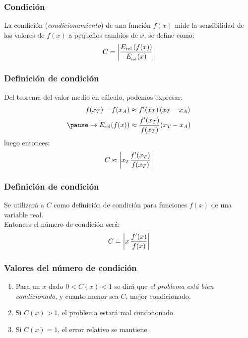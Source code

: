 \documentclass[12pt]{beamer}
\begin{document}
\begin{frame}
\frametitle{Condición}
La condición (\emph{condicionamiento}) de una función $f(x)$ mide la sensibilidad de los valores de $f(x)$ a pequeños
cambios de $x$, se define como:
\pause
\begin{align*}
C = \abs{ \dfrac{E_{\text{rel}} \, (f (x))}{E_{_\text{rel}} (x)} }
\end{align*}
\end{frame}
\begin{frame}
\frametitle{Definición de condición}
Del teorema del valor medio en cálculo, podemos expresar:
\pause
\begin{eqnarray*}
\begin{aligned}
f (x_{T}) - f (x_{A})  &\approx \pderivada{f} (x_{T}) \, (x_{T} - x_{A}) \\ \pause
\rightarrow E_{\text{rel}} (f (x)) &\approx \dfrac{ \pderivada{f} (x_{T})}{ f(x_{T})} (x_{T} - x_{A})
\end{aligned}
\end{eqnarray*}
luego entonces:
\pause
\begin{align*}
C \approx \abs{ x_{T} \dfrac{{f}^{\prime} (x_{T})}{f (x_{T})} }
\end{align*}
\end{frame}
\begin{frame}
\frametitle{Definición de condición}
Se utilizará a $C$ como definición de condición para funciones $f (x)$ de una variable real.
\\
\bigskip
\pause
Entonces el número de condición será:
\pause
\begin{align*}
C = \abs{ x \, \dfrac{{f}^{\prime} (x)}{f (x)} }
\end{align*}
\end{frame}
\begin{frame}
\frametitle{Valores del número de condición}
\begin{enumerate}[<+->]
\item Para un $x$ dado $0 < C (x) < 1$ se dirá que \emph{el problema está bien condicionado}, \pause y cuanto menor sea $C$, mejor condicionado. \pause
\item Si $C (x) > 1$, el problema estará mal condicionado.
\item Si $C (x) = 1$, el error relativo se mantiene.
\end{enumerate}
\end{frame}
\end{document}
